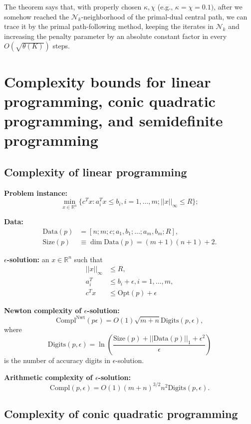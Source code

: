 \documentclass[11pt,a4paper]{article}
\newcommand{\R}{\mathbb{R}}
\begin{document}
The theorem says that, with properly chosen $\kappa, \chi$ (e.g., $\kappa = \chi=0.1)$, after we somehow reached the $\mathcal{N}_k$-neighborhood of the primal-dual central path, we can trace it by the primal path-following method, keeping the iterates in $\mathcal{N}_k$ and increasing the penalty parameter by an absolute constant factor in every $O(\sqrt{\theta(K)})$ steps.

\section{Complexity bounds for linear programming, conic quadratic programming, and semidefinite programming}



\subsection{Complexity of linear programming}

\textbf{Problem instance:}
\begin{equation}
    \underset{x \in \R^n}{\min} \{c^Tx : a_i^Tx \leq b_i, i=1,\dots, m; ||x||_\infty \leq R\}; \tag{$p$}
\end{equation}

\textbf{Data:}
\begin{align*}
    \text{Data}(p) &= [n;m;c;a_1,b_1;\dots;a_m,b_m;R],\\
    \text{Size}(p) &\equiv \dim \text{Data}(p) = (m+1)(n+1)+2.
\end{align*}

\textbf{$\epsilon$-solution:} an $x \in \R^n$ such that
\begin{align*}
    ||x||_\infty &\leq R,\\
    a_i^T &\leq b_i+\epsilon, i=1,\dots,m,\\
    c^Tx &\leq \text{Opt}(p)+\epsilon
\end{align*}

\textbf{Newton complexity of $\epsilon$-solution:}
\[\text{Compl}^\text{Nwt}(p\epsilon) = O(1)\sqrt{m+n}\text{Digits}(p,\epsilon),\]
where
\[\text{Digits}(p,\epsilon)=\ln\left(\frac{\text{Size}(p)+||\text{Data}(p)||_1+\epsilon^2}{\epsilon}\right)\]
is the number of accuracy digits in $\epsilon$-solution.

\textbf{Arithmetic complexity of $\epsilon$-solution:}
\[\text{Compl}(p,\epsilon) = O(1)(m+n)^{3/2}n^2\text{Digits}(p,\epsilon).\]

\subsection{Complexity of conic quadratic programming}
\end{document}
